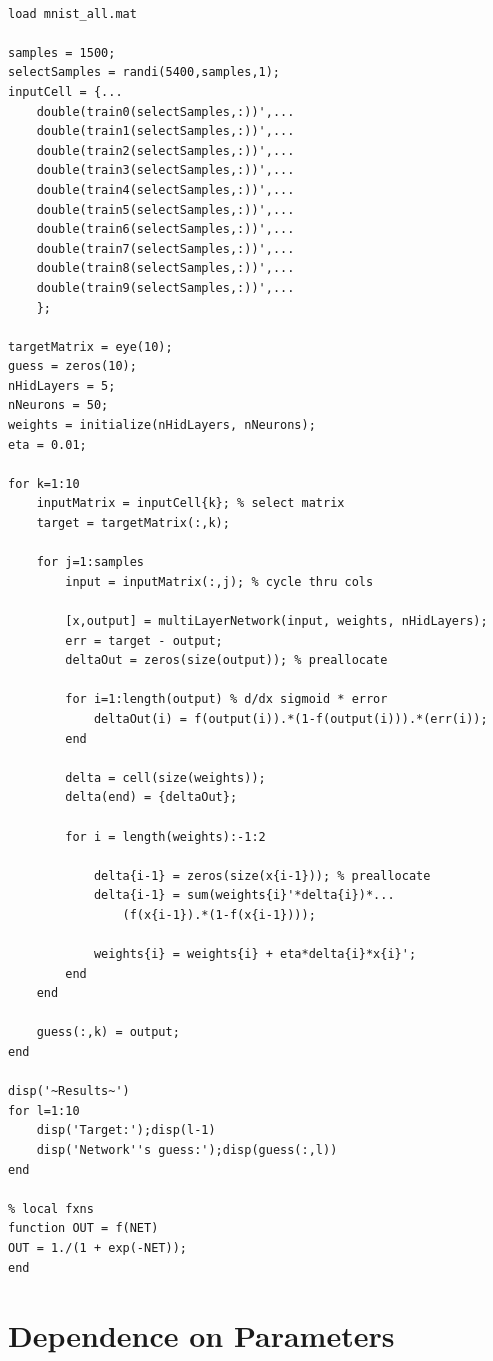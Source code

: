 \documentclass[letterpaper,11pt]{article}
\begin{document}
\begin{verbatim}

load mnist_all.mat

samples = 1500;
selectSamples = randi(5400,samples,1);
inputCell = {...
    double(train0(selectSamples,:))',...
    double(train1(selectSamples,:))',...
    double(train2(selectSamples,:))',...
    double(train3(selectSamples,:))',...
    double(train4(selectSamples,:))',...
    double(train5(selectSamples,:))',...
    double(train6(selectSamples,:))',...
    double(train7(selectSamples,:))',...
    double(train8(selectSamples,:))',...
    double(train9(selectSamples,:))',...
    };

targetMatrix = eye(10);
guess = zeros(10);
nHidLayers = 5; 
nNeurons = 50;
weights = initialize(nHidLayers, nNeurons);
eta = 0.01;

for k=1:10
    inputMatrix = inputCell{k}; % select matrix
    target = targetMatrix(:,k);

    for j=1:samples
        input = inputMatrix(:,j); % cycle thru cols
    
        [x,output] = multiLayerNetwork(input, weights, nHidLayers);
        err = target - output;
        deltaOut = zeros(size(output)); % preallocate

        for i=1:length(output) % d/dx sigmoid * error
            deltaOut(i) = f(output(i)).*(1-f(output(i))).*(err(i));
        end

        delta = cell(size(weights));
        delta(end) = {deltaOut};

        for i = length(weights):-1:2
   
            delta{i-1} = zeros(size(x{i-1})); % preallocate
            delta{i-1} = sum(weights{i}'*delta{i})*...
                (f(x{i-1}).*(1-f(x{i-1})));

            weights{i} = weights{i} + eta*delta{i}*x{i}';
        end    
    end
    
    guess(:,k) = output;
end

disp('~Results~')
for l=1:10
    disp('Target:');disp(l-1)
    disp('Network''s guess:');disp(guess(:,l))
end

% local fxns
function OUT = f(NET)
OUT = 1./(1 + exp(-NET));
end

\end{verbatim}

\section{Dependence on Parameters}
\end{document}
